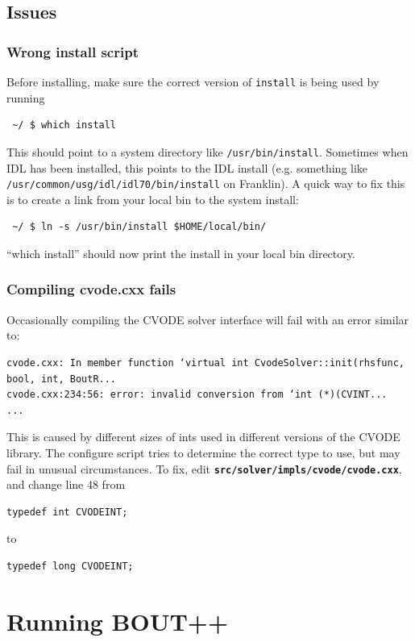 \documentclass[12pt]{article}
\newcommand{\file}[1]{\texttt{\bf #1}}
\begin{document}
\subsection{Issues}

\subsubsection{Wrong install script}
Before installing, make sure the correct version of \texttt{install} is being used by running
\begin{verbatim}
 ~/ $ which install
\end{verbatim}
This should point to a system directory like \texttt{/usr/bin/install}. Sometimes when IDL has been
installed, this points to the IDL install (e.g. something like \texttt{/usr/common/usg/idl/idl70/bin/install} on Franklin). A quick way to fix this is to create a link from your local bin to the system install:
\begin{verbatim}
 ~/ $ ln -s /usr/bin/install $HOME/local/bin/
\end{verbatim}
``which install'' should now print the install in your local bin directory.

\subsubsection{Compiling cvode.cxx fails}
Occasionally compiling the CVODE solver interface will fail with an error similar to:
\begin{verbatim}
cvode.cxx: In member function ‘virtual int CvodeSolver::init(rhsfunc, bool, int, BoutR...
cvode.cxx:234:56: error: invalid conversion from ‘int (*)(CVINT...
...
\end{verbatim}

This is caused by different sizes of ints used in different versions of the CVODE library. 
The configure script tries to determine the correct type to use, but may fail in unusual circumstances.
To fix, edit
\file{src/solver/impls/cvode/cvode.cxx}, and change line 48 from
\begin{lstlisting}[numbers=none]
typedef int CVODEINT;
\end{lstlisting}
to
\begin{lstlisting}[numbers=none]
typedef long CVODEINT;
\end{lstlisting}

\section{Running BOUT++}
\label{sec:running}
\end{document}
